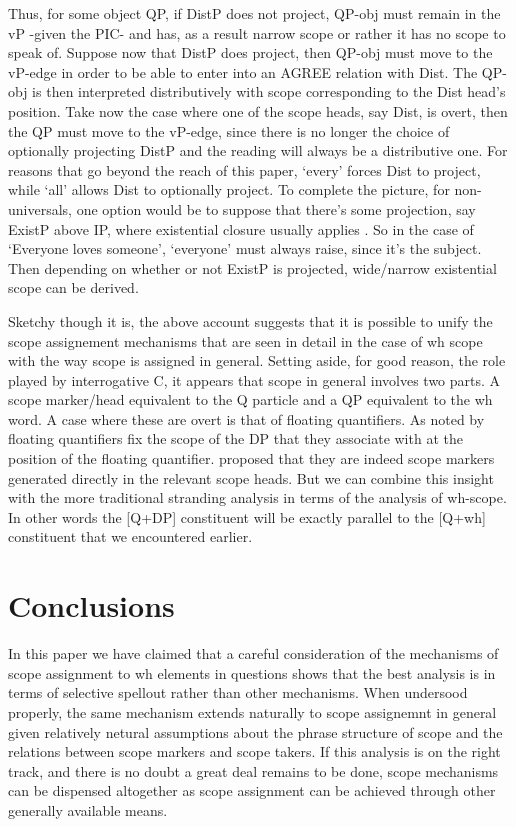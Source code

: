 \documentclass{glossa}
\begin{document}
Thus, for some object QP, if DistP does not project, QP-obj must remain in the vP -given the  PIC- and has, as a result narrow scope or rather it has no scope to speak of. Suppose now that DistP does project, then QP-obj must move to the vP-edge in order to be able to enter into an AGREE relation with Dist. The QP-obj is then interpreted distributively with scope corresponding to the Dist head's position.
Take now the case where one of the scope heads, say Dist, is overt, then the QP must move to the vP-edge, since there is no longer the choice of optionally projecting DistP and the reading will always be a distributive one.  For reasons that go beyond the reach of this paper, `every' forces Dist to project, while `all' allows Dist to optionally project.
To complete the picture, for non-universals, one option would be to  suppose that there's some projection, say ExistP above IP, where existential closure usually applies \citep{kratzer:2005}. So in the case of  `Everyone loves someone', `everyone' must always raise, since it's the subject. Then depending on whether or not ExistP is projected,  wide/narrow existential scope can be derived.

Sketchy though it is, the above account suggests that it is possible to unify the scope assignement mechanisms that are seen in detail in the case of wh scope with the way scope is assigned in general.  Setting aside, for good reason, the role played by interrogative C, it appears that scope in general involves two parts.  A scope marker/head equivalent to the Q particle and a QP equivalent to the wh word.  A case where these are overt is that of floating quantifiers.  As noted by \citet{dowty-brodie:1984} floating quantifiers fix the scope of the DP that they associate with at the position of the floating quantifier.  \citet{tsoulas:2003} proposed that they are indeed scope markers generated directly in the relevant scope heads.  But we can combine this insight with the more traditional stranding analysis in terms of the analysis of wh-scope.  In other words the [Q+DP] constituent will be exactly parallel to the [Q+wh] constituent that we encountered earlier.


\section{Conclusions}
In this paper we have claimed that a careful consideration of the mechanisms of scope assignment to wh elements in questions shows that the best analysis is in terms of selective spellout rather than other mechanisms.  When undersood properly, the same mechanism extends naturally to scope assignemnt in general given relatively netural assumptions about the phrase structure of scope and the relations between scope markers and scope takers.  If this analysis is on the right track, and there is no doubt a great deal remains to be done, scope mechanisms can be dispensed altogether as scope assignment can be achieved through other generally available means.
\end{document}
